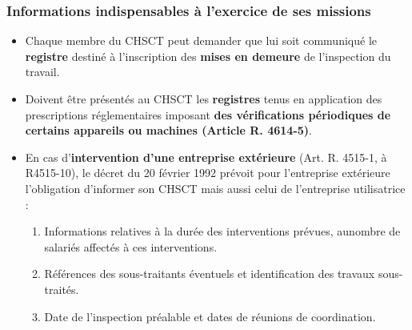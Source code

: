 \documentclass{beamer}
\begin{document}
\begin{frame}
\frametitle{Informations indispensables à l'exercice de ses missions}
\begin{itemize}
\item Chaque membre du CHSCT peut demander que lui soit communiqué le \textbf{registre} destiné à l'inscription des \textbf{mises en demeure} de l'inspection du travail.

\item Doivent être présentés au CHSCT les \textbf{registres} tenus en application des prescriptions réglementaires imposant \textbf{des vérifications périodiques de certains appareils ou machines (Article R. 4614-5)}.

\item En cas d’\textbf{intervention d'une entreprise extérieure} (Art. R. 4515-1, à R4515-10), le décret du 20 février 1992 prévoit pour l'entreprise extérieure l'obligation d'informer son CHSCT mais aussi celui de l'entreprise utilisatrice :
\begin{enumerate}
\item Informations relatives à la durée des interventions prévues, aunombre de salariés affectés à ces interventions. 

\item Références des sous-traitants éventuels et identification des travaux sous-traités. 

\item Date de l'inspection préalable et dates de réunions de coordination.
\end{enumerate}
\end{itemize}
\end{frame}
\end{document}
